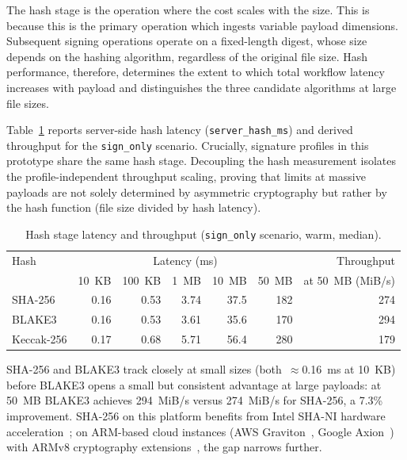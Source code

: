 \documentclass[12pt,a4paper]{article}
\begin{document}
The hash stage is the operation where the cost scales with the size. This is because this is the primary operation which ingests variable payload dimensions. Subsequent signing operations operate on a fixed-length digest, whose size depends on the hashing algorithm, regardless of the original file size. Hash performance, therefore, determines the extent to which total workflow latency increases with payload and distinguishes the three candidate algorithms at large file sizes.

Table~\ref{tab:hash_latency} reports server-side hash latency (\texttt{server\_hash\_ms}) and derived throughput for the \texttt{sign\_only} scenario. Crucially, signature profiles in this prototype share the same hash stage. Decoupling the hash measurement isolates the profile-independent throughput scaling, proving that limits at massive payloads are not solely determined by asymmetric cryptography but rather by the hash function (file size divided by hash latency).

\begin{table}[H]
\centering
\caption[Hash stage latency and throughput]{Hash stage latency and throughput (\texttt{sign\_only} scenario, warm, median).}
\label{tab:hash_latency}
\setlength{\tabcolsep}{4pt}
\begin{tabular}{l rrrrr r}
\toprule
Hash & \multicolumn{5}{c}{Latency (ms)} & Throughput \\
     & 10~KB & 100~KB & 1~MB & 10~MB & 50~MB & at 50~MB (MiB/s) \\
\midrule
SHA-256    & 0.16 & 0.53 & 3.74 & 37.5 & 182 & 274 \\
BLAKE3     & 0.16 & 0.53 & 3.61 & 35.6 & 170 & 294 \\
Keccak-256 & 0.17 & 0.68 & 5.71 & 56.4 & 280 & 179 \\
\bottomrule
\end{tabular}
\end{table}

SHA-256 and BLAKE3 track closely at small sizes (both~$\approx$0.16~ms at 10~KB) before BLAKE3 opens a small but consistent advantage at large payloads: at 50~MB BLAKE3 achieves 294~MiB/s versus 274~MiB/s for SHA-256, a 7.3\% improvement. SHA-256 on this platform benefits from Intel SHA-NI hardware acceleration~\cite{intel-sha-ni}; on ARM-based cloud instances (AWS Graviton~\cite{aws-graviton}, Google Axion~\cite{google-axion}) with ARMv8 cryptography extensions~\cite{arm-crypto-ext}, the gap narrows further.
\end{document}
